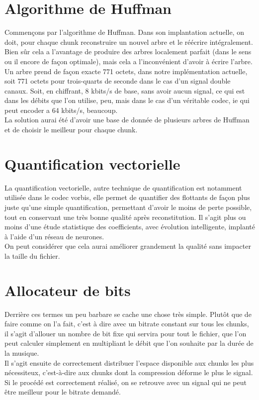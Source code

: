 \documentclass[a4paper,12pt]{report}
\begin{document}
\section{Algorithme de Huffman}
Commençons par l'algorithme de Huffman. Dans son implantation actuelle, on doit,
pour chaque chunk reconstruire un nouvel arbre et le réécrire intégralement.
Bien sûr cela a l'avantage de produire des arbres localement parfait (dans le
sens ou il encore de façon optimale), mais cela a l'inconvénient d'avoir à
écrire l'arbre. Un arbre prend de façon exacte 771 octets, dans notre
implémentation actuelle, soit 771 octets pour trois-quarts de seconde dans le
cas d'un signal double canaux. Soit, en chiffrant, 8 kbits/s de base, sans avoir
aucun signal, ce qui est dans les débits que l'on utilise, peu, mais dans le cas
d'un véritable codec, ie qui peut encoder a 64 kbits/s, beaucoup.\\
La solution aurai été d'avoir une base de donnée de plusieurs arbres de Huffman
et de choisir le meilleur pour chaque chunk.
\section{Quantification vectorielle}
La quantification vectorielle, autre technique de quantification est notamment
utilisée dans le codec vorbis, elle permet de quantifier des flottants de façon
plus juste qu'une simple quantification, permettant d'avoir le moins de perte
possible, tout en conservant une très bonne qualité après reconstitution. Il
s'agit plus ou moins d'une étude statistique des coefficients, avec évolution
intelligente, implanté à l'aide d'un réseau de neurones.\\
On peut considérer que cela aurai améliorer grandement la qualité sans impacter
la taille du fichier.
\section{Allocateur de bits}
Derrière ces termes un peu barbare se cache une chose très simple. Plutôt que de
faire comme on l'a fait, c'est à dire avec un bitrate constant sur tous les
chunks, il s'agit d'allouer un nombre de bit fixe qui servira pour tout le
fichier, que l'on peut calculer simplement en multipliant le débit que l'on
souhaite par la durée de la musique.\\
Il s'agit ensuite de correctement distribuer l'espace disponible aux chunks les
plus nécessiteux, c'est-à-dire aux chunks dont la compression déforme le plus le
signal. Si le procédé est correctement réalisé, on se retrouve avec un signal
qui ne peut être meilleur pour le bitrate demandé.
\end{document}
